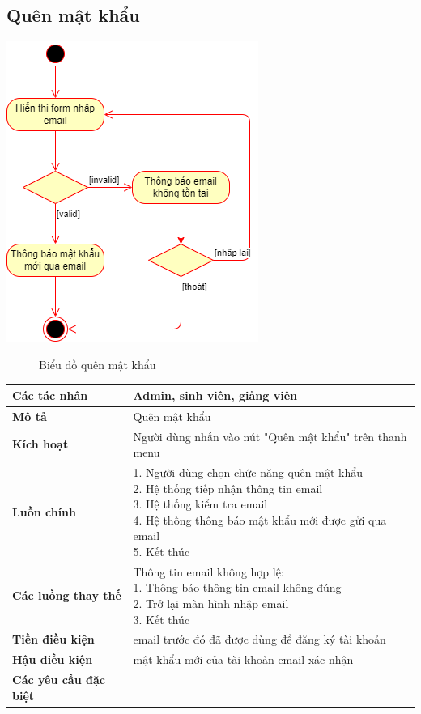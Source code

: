 \subsection{Quên mật khẩu}
\begin{center}
	\includegraphics[width=.7\textwidth]{../drawio/activity/forgot_password.png}
	\begin{figure}[h]
		\centering
		\caption{Biểu đồ quên mật khẩu}
	\end{figure}
\end{center}
\begin{tabular}{|l|l|}
	\hline
	\textbf{Các tác nhân}         & Admin, sinh viên, giảng viên                            \\
	\hline
	\textbf{Mô tả}                & Quên mật khẩu                                           \\
	\hline
	\textbf{Kích hoạt}            & Người dùng nhấn vào nút "Quên mật khẩu" trên thanh menu \\
	\hline
	\textbf{Luồn chính}           & \makecell[l]{1. Người dùng chọn chức năng quên mật khẩu \\ 2. Hệ thống tiếp nhận thông tin email \\ 3. Hệ thống kiểm tra email \\ 4. Hệ thống thông báo mật khẩu mới được gửi qua email \\ 5. Kết thúc} \\
	\hline
	\textbf{Các luồng thay thế}   & \makecell[l]{Thông tin email không hợp lệ:              \\ 1. Thông báo thông tin email không đúng \\ 2. Trở lại màn hình nhập email \\ 3. Kết thúc} \\
	\hline
	\textbf{Tiền điều kiện}       & email trước đó đã được dùng để đăng ký tài khoản        \\
	\hline
	\textbf{Hậu điều kiện}        & mật khẩu mới của tài khoản email xác nhận               \\
	\hline
	\textbf{Các yêu cầu đặc biệt} &                                                         \\
	\hline
\end{tabular}


